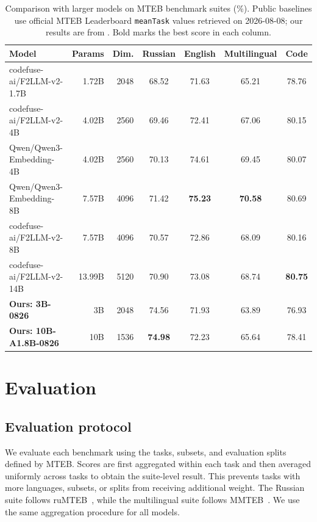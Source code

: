\documentclass[11pt]{article}
\begin{document}
\begin{table}[!t]
  \caption{Comparison with larger models on MTEB benchmark suites (\%). Public baselines use official MTEB Leaderboard \texttt{meanTask} values retrieved on 2026-08-08; our results are from . Bold marks the best score in each column.}
  \label{tab:large-baselines}
  \centering
  \small
  \setlength{\tabcolsep}{4.5pt}
  \begin{tabular}{lrrcccc}
    \toprule
    \textbf{Model} & \textbf{Params} & \textbf{Dim.} & \textbf{Russian} & \textbf{English} & \textbf{Multilingual} & \textbf{Code} \\
    \midrule
    codefuse-ai/F2LLM-v2-1.7B                              & 1.72B  & 2048 & 68.52 & 71.63 & 65.21 & 78.76 \\
    codefuse-ai/F2LLM-v2-4B                                & 4.02B  & 2560 & 69.46 & 72.41 & 67.06 & 80.15 \\
    Qwen/Qwen3-Embedding-4B                                & 4.02B  & 2560 & 70.13 & 74.61 & 69.45 & 80.07 \\
    Qwen/Qwen3-Embedding-8B                                & 7.57B  & 4096 & 71.42 & \textbf{75.23} & \textbf{70.58} & 80.69 \\
    codefuse-ai/F2LLM-v2-8B                                & 7.57B  & 4096 & 70.57 & 72.86 & 68.09 & 80.16 \\
    codefuse-ai/F2LLM-v2-14B                               & 13.99B & 5120 & 70.90 & 73.08 & 68.74 & \textbf{80.75} \\
    \midrule
    \textbf{Ours: 3B-0826}                                 & 3B     & 2048 & 74.56 & 71.93 & 63.89 & 76.93 \\
    \textbf{Ours: 10B-A1.8B-0826}                          & 10B    & 1536 & \textbf{74.98} & 72.23 & 65.64 & 78.41 \\
    \bottomrule
  \end{tabular}
\end{table}

\section{Evaluation}
\label{sec:evaluation}

\subsection{Evaluation protocol}

We evaluate each benchmark using the tasks, subsets, and evaluation splits defined by MTEB.
Scores are first aggregated within each task and then averaged uniformly across tasks to obtain the suite-level result.
This prevents tasks with more languages, subsets, or splits from receiving additional weight.
The Russian suite follows ruMTEB~\citep{snegirev2025rumteb}, while the multilingual suite follows MMTEB~\citep{enevoldsen2025mmteb}.
We use the same aggregation procedure for all models.
\end{document}

